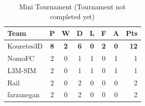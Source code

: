 \begin{table}[t!]
\caption{Mini Tournament (Tournament not completed yet)}
\label{EasyTournament}
\begin{center}
\begin{tabular}{l*{6}{c}r}
Team              	& P & W & D & L & F  & A & Pts \\ \hline
Kouretes3D 		& \textbf{8} & \textbf{2} & \textbf{6} & \textbf{0} & \textbf{ 2} & \textbf{0} &  \textbf{12}  \\
NomoFC            	& 2 & 0 & 1 & 1 &  0 & 1 &  1  \\
L3M-SIM     		& 2 & 0 & 1 & 1 &  0 & 1 &  1  \\
Rail     		    & 2 & 0 & 2 & 0 &  0 & 0 &  2  \\
farzanegan     		& 2 & 0 & 2 & 0 &  0 & 0 &  2  \\
\end{tabular}
\end{center}
\end{table}






